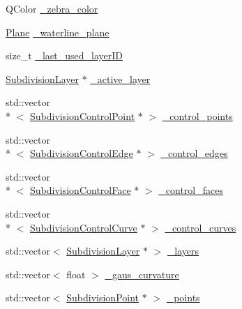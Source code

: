 \begin{DoxyCompactItemize}
\item 
Q\-Color \hyperlink{classShipCAD_1_1SubdivisionSurface_a047d5d0575c944d216ada589e30ee3bd}{\-\_\-zebra\-\_\-color}
\item 
\hyperlink{classShipCAD_1_1Plane}{Plane} \hyperlink{classShipCAD_1_1SubdivisionSurface_a762de21a330588c7bfbe081637cab2f3}{\-\_\-waterline\-\_\-plane}
\item 
size\-\_\-t \hyperlink{classShipCAD_1_1SubdivisionSurface_a0ba5c4e08110400890eb60140f3e2058}{\-\_\-last\-\_\-used\-\_\-layer\-I\-D}
\item 
\hyperlink{classShipCAD_1_1SubdivisionLayer}{Subdivision\-Layer} $\ast$ \hyperlink{classShipCAD_1_1SubdivisionSurface_aef766e0b62189247c0f3214c56800040}{\-\_\-active\-\_\-layer}
\item 
std\-::vector\\*
$<$ \hyperlink{classShipCAD_1_1SubdivisionControlPoint}{Subdivision\-Control\-Point} $\ast$ $>$ \hyperlink{classShipCAD_1_1SubdivisionSurface_a906d5981dc482ede1bb3c7256e750945}{\-\_\-control\-\_\-points}
\item 
std\-::vector\\*
$<$ \hyperlink{classShipCAD_1_1SubdivisionControlEdge}{Subdivision\-Control\-Edge} $\ast$ $>$ \hyperlink{classShipCAD_1_1SubdivisionSurface_ac6b2950f05e07f5a7814b278a9dc1513}{\-\_\-control\-\_\-edges}
\item 
std\-::vector\\*
$<$ \hyperlink{classShipCAD_1_1SubdivisionControlFace}{Subdivision\-Control\-Face} $\ast$ $>$ \hyperlink{classShipCAD_1_1SubdivisionSurface_a69c240904f61f8181a57559d4fa548c0}{\-\_\-control\-\_\-faces}
\item 
std\-::vector\\*
$<$ \hyperlink{classShipCAD_1_1SubdivisionControlCurve}{Subdivision\-Control\-Curve} $\ast$ $>$ \hyperlink{classShipCAD_1_1SubdivisionSurface_a72da0f8a60e186e10b88f48950a490e9}{\-\_\-control\-\_\-curves}
\item 
std\-::vector$<$ \hyperlink{classShipCAD_1_1SubdivisionLayer}{Subdivision\-Layer} $\ast$ $>$ \hyperlink{classShipCAD_1_1SubdivisionSurface_a87c6c8b63f203d788b8f4b361c814c96}{\-\_\-layers}
\item 
std\-::vector$<$ float $>$ \hyperlink{classShipCAD_1_1SubdivisionSurface_a20cbcc689f7b2f8af21f502748521185}{\-\_\-gaus\-\_\-curvature}
\item 
std\-::vector$<$ \hyperlink{classShipCAD_1_1SubdivisionPoint}{Subdivision\-Point} $\ast$ $>$ \hyperlink{classShipCAD_1_1SubdivisionSurface_ab03b7f4694a63eeb3ebb831484cb1bff}{\-\_\-points}

\end{DoxyCompactItemize}
